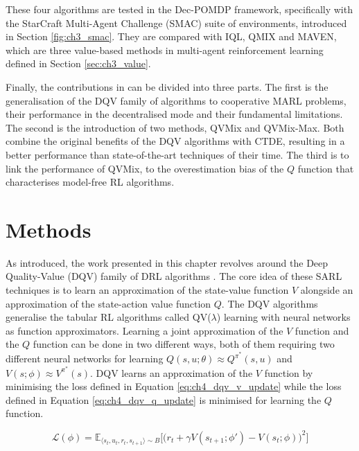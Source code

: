 These four algorithms are tested in the Dec-POMDP framework, specifically with the StarCraft Multi-Agent Challenge (SMAC) suite of environments, introduced in Section \ref{fig:ch3_smac}.
They are compared with IQL, QMIX and MAVEN, which are three value-based methods in multi-agent reinforcement learning defined in Section \ref{sec:ch3_value}.

Finally, the contributions in \citep{leroy2020qvmix} can be divided into three parts.
The first is the generalisation of the DQV family of algorithms to cooperative MARL problems, their performance in the decentralised mode and their fundamental limitations.
The second is the introduction of two methods, QVMix and QVMix-Max.
Both combine the original benefits of the DQV algorithms with CTDE, resulting in a better performance than state-of-the-art techniques of their time.
The third is to link the performance of QVMix, to the overestimation bias of the $Q$ function that characterises model-free RL algorithms.

\section{Methods} \label{sec:ch4_methods} 

As introduced, the work presented in this chapter revolves around the Deep Quality-Value (DQV) family of DRL algorithms \cite{sabatelli2018deepQV, sabatelli2020deep}.
The core idea of these SARL techniques is to learn an approximation of the state-value function $V$ alongside an approximation of the state-action value function $Q$.
The DQV algorithms generalise the tabular RL algorithms called QV($\lambda$) learning \citep{wiering2005qv, wiering2009qv} with neural networks as function approximators.
Learning a joint approximation of the $V$ function and the $Q$ function can be done in two different ways, both of them requiring two different neural networks for learning $Q(s, u;\theta)\approx Q^{\pi^*}(s, u)$ and $V(s;\phi)\approx V^{\pi^*}(s)$.
DQV learns an approximation of the $V$ function by minimising the loss defined in Equation \ref{eq:ch4_dqv_v_update} while the loss defined in Equation \ref{eq:ch4_dqv_q_update} is minimised for learning the $Q$ function.

\begin{equation}
    \mathcal{L}(\phi) = \mathbb{E}_{\langle s_{t}, u_{t},r_{t},s_{t+1}\rangle\sim B} \bigg[\big(r_{t} + \gamma V(s_{t+1}; \phi') - V(s_{t}; \phi)\big)^{2}\bigg]
    \label{eq:ch4_dqv_v_update}
\end{equation}
    
